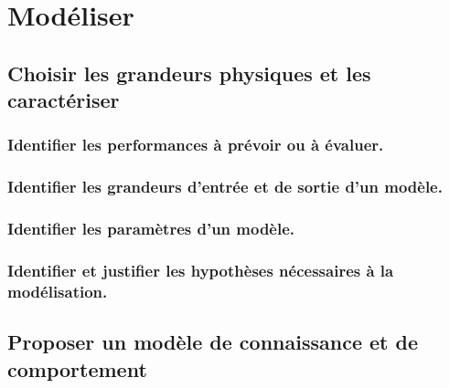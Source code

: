 \documentclass[10pt,fleqn]{book}
\begin{document}
\begin{multicols}{2} 

\end{multicols}

\chapter{Modéliser} 

\section{Choisir les grandeurs physiques et les caractériser} 

\subsection{Identifier les performances à prévoir ou à évaluer.} 

\begin{multicols}{2} 

\end{multicols}

\subsection{Identifier les grandeurs d'entrée et de sortie d’un modèle.} 

\begin{multicols}{2} 

\end{multicols}

\subsection{Identifier les paramètres d’un modèle.} 

\begin{multicols}{2} 

\end{multicols}

\subsection{Identifier et justifier les hypothèses nécessaires à la modélisation.} 

\begin{multicols}{2} 

\end{multicols}

\section{Proposer un modèle de connaissance et de comportement} 
\end{document}

